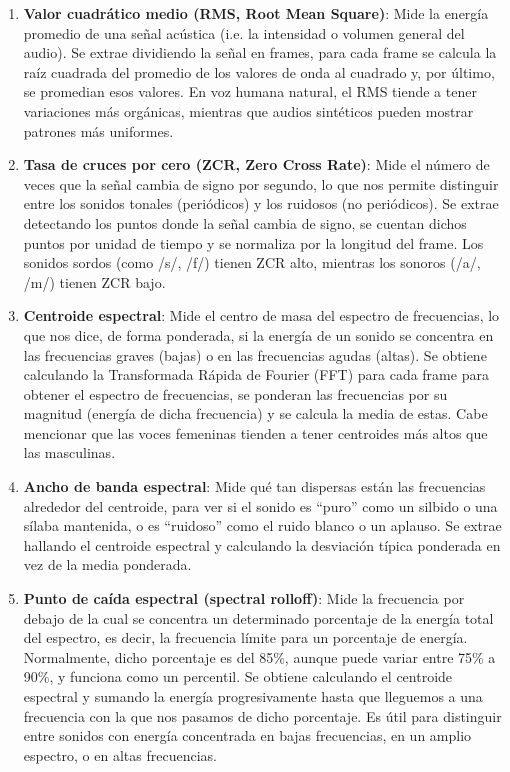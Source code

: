 \begin{enumerate}
	\item \textbf{Valor cuadrático medio (RMS, Root Mean Square)}: Mide la energía promedio de una señal acústica (i.e. la intensidad o volumen general del audio). Se extrae dividiendo la señal en frames, para cada frame se calcula la raíz cuadrada del promedio de los valores de onda al cuadrado y, por último, se promedian esos valores. En voz humana natural, el RMS tiende a tener variaciones más orgánicas, mientras que audios sintéticos pueden mostrar patrones más uniformes.
	\item \textbf{Tasa de cruces por cero (ZCR, Zero Cross Rate)}: Mide el número de veces que la señal cambia de signo por segundo, lo que nos permite distinguir entre los sonidos tonales (periódicos) y los ruidosos (no periódicos). Se extrae detectando los puntos donde la señal cambia de signo, se cuentan dichos puntos por unidad de tiempo y se normaliza por la longitud del frame. Los sonidos sordos (como /s/, /f/) tienen ZCR alto, mientras los sonoros (/a/, /m/) tienen ZCR bajo.
	\item \textbf{Centroide espectral}: Mide el centro de masa del espectro de frecuencias, lo que nos dice, de forma ponderada, si la energía de un sonido se concentra en las frecuencias graves (bajas) o en las frecuencias agudas (altas). Se obtiene calculando la Transformada Rápida de Fourier (FFT) para cada frame para obtener el espectro de frecuencias, se ponderan las frecuencias por su magnitud (energía de dicha frecuencia) y se calcula la media de estas. Cabe mencionar que las voces femeninas tienden a tener centroides más altos que las masculinas.
	\item \textbf{Ancho de banda espectral}: Mide qué tan dispersas están las frecuencias alrededor del centroide, para ver si el sonido es ``puro'' como un silbido o una sílaba mantenida, o es ``ruidoso'' como el ruido blanco o un aplauso. Se extrae hallando el centroide espectral y calculando la desviación típica ponderada en vez de la media ponderada. 
	\item \textbf{Punto de caída espectral (spectral rolloff)}: Mide la frecuencia por debajo de la cual se concentra un determinado porcentaje de la energía total del espectro, es decir, la frecuencia límite para un porcentaje de energía. Normalmente, dicho porcentaje es del 85\%, aunque puede variar entre 75\% a 90\%, y funciona como un percentil. Se obtiene calculando el centroide espectral y sumando la energía progresivamente hasta que lleguemos a una frecuencia con la que nos pasamos de dicho porcentaje. Es útil para distinguir entre sonidos con energía concentrada en bajas frecuencias, en un amplio espectro, o en altas frecuencias.

\end{enumerate}
